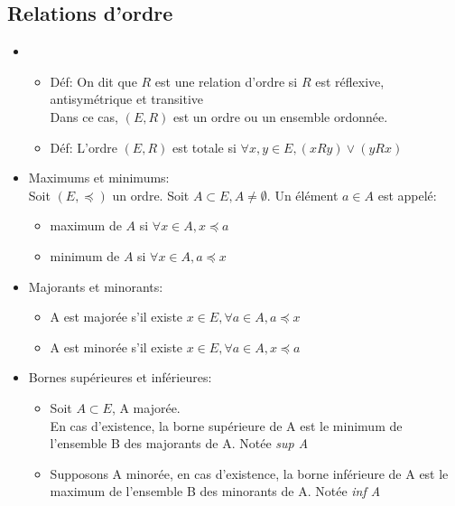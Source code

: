 \documentclass[fleqn]{article}
\begin{document}
\subsection{Relations d'ordre}
\begin{itemize}
	\item
		\begin{itemize}
			\item D\'ef: On dit que \(R\) est une relation d'ordre si \(R\) est r\'eflexive, antisym\'etrique et transitive \\
				Dans ce cas, \((E,R)\) est un ordre ou un ensemble ordonn\'ee.
			\item D\'ef: L'ordre \((E,R)\) est totale si \(\forall x,y \in E, (xRy) \lor (yRx)\)
		\end{itemize}
	\item Maximums et minimums: \\
		Soit \((E, \preceq)\) un ordre. Soit \(A \subset E, A \neq \emptyset\). Un \'el\'ement \(a \in A\) est appel\'e:
		\begin{itemize}
			\item maximum de \(A\) si \(\forall x \in A, x \preceq a\)
			\item minimum de \(A\) si \(\forall x \in A, a \preceq x\)
		\end{itemize}
	\item Majorants et minorants:
		\begin{itemize}
			\item A est major\'ee s'il existe \(x \in E, \forall a \in A, a \preceq x\)
			\item A est minor\'ee s'il existe \(x \in E, \forall a \in A, x \preceq a\)
		\end{itemize}
	\item Bornes sup\'erieures et inf\'erieures:
		\begin{itemize}
			\item Soit \(A \subset E\), A major\'ee. \\
			En cas d'existence, la borne sup\'erieure de A est le minimum de l'ensemble B des majorants de A. Not\'ee \emph{sup A}
			\item Supposons A minor\'ee, en cas d'existence, la borne inf\'erieure de A est le maximum de l'ensemble B des minorants de A. Not\'ee \emph{inf A} \\
		\end{itemize}
\end{itemize}
\end{document}
